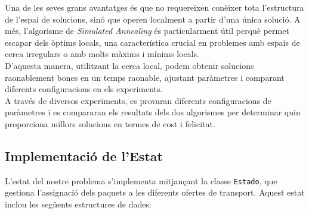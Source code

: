 \documentclass[a4paper]{article}
\begin{document}
	Una de les seves grans avantatges és que no requereixen conèixer tota l'estructura de l'espai de solucions, sinó que operen localment a partir d'una única solució. A més, l'algorisme de \textit{Simulated Annealing} és particularment útil perquè permet escapar dels òptims locals, una característica crucial en problemes amb espais de cerca irregulars o amb molts màxims i mínims locals. \\
	
	D'aquesta manera, utilitzant la cerca local, podem obtenir solucions raonablement bones en un temps raonable, ajustant paràmetres i comparant diferents configuracions en els experiments. \\
	
	A través de diversos experiments, es provaran diferents configuracions de paràmetres i es compararan els resultats dels dos algorismes per determinar quin proporciona millors solucions en termes de cost i felicitat.
	
	\subsection{Implementació de l'Estat}
	
	L'estat del nostre problema s'implementa mitjançant la classe \texttt{Estado}, que gestiona l'assignació dels paquets a les diferents ofertes de transport. Aquest estat inclou les següents estructures de dades:
	
\end{document}
